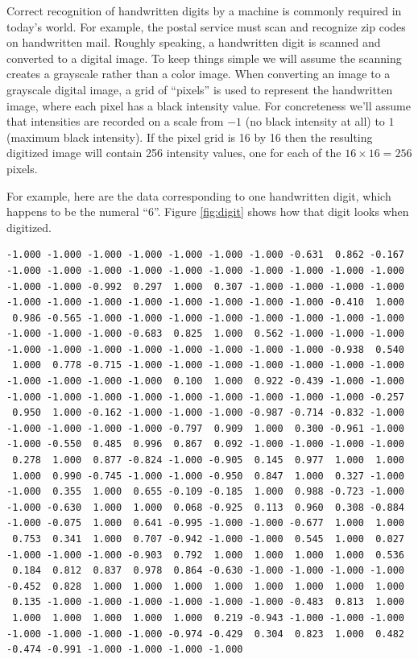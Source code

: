 \documentclass[]{krantz}
\begin{document}
Correct recognition of handwritten digits by a machine is commonly required in today's world. For example, the postal service must scan and recognize zip codes on handwritten mail. Roughly speaking, a handwritten digit is scanned and converted to a digital image. To keep things simple we will assume the scanning creates a grayscale rather than a color image. When converting an image to a grayscale digital image, a grid of ``pixels'' is used to represent the handwritten image, where each pixel has a black intensity value. For concreteness we'll assume that intensities are recorded on a scale from \(-1\) (no black intensity at all) to \(1\) (maximum black intensity). If the pixel grid is 16 by 16 then the resulting digitized image will contain 256 intensity values, one for each of the \(16\times 16 = 256\) pixels.

For example, here are the data corresponding to one handwritten digit, which happens to be the numeral ``6''. Figure \ref{fig:digit} shows how that digit looks when digitized.

\begin{verbatim}
-1.000 -1.000 -1.000 -1.000 -1.000 -1.000 -1.000 -0.631  0.862 -0.167 
-1.000 -1.000 -1.000 -1.000 -1.000 -1.000 -1.000 -1.000 -1.000 -1.000 
-1.000 -1.000 -0.992  0.297  1.000  0.307 -1.000 -1.000 -1.000 -1.000 
-1.000 -1.000 -1.000 -1.000 -1.000 -1.000 -1.000 -1.000 -0.410  1.000 
 0.986 -0.565 -1.000 -1.000 -1.000 -1.000 -1.000 -1.000 -1.000 -1.000 
-1.000 -1.000 -1.000 -0.683  0.825  1.000  0.562 -1.000 -1.000 -1.000 
-1.000 -1.000 -1.000 -1.000 -1.000 -1.000 -1.000 -1.000 -0.938  0.540 
 1.000  0.778 -0.715 -1.000 -1.000 -1.000 -1.000 -1.000 -1.000 -1.000 
-1.000 -1.000 -1.000 -1.000  0.100  1.000  0.922 -0.439 -1.000 -1.000 
-1.000 -1.000 -1.000 -1.000 -1.000 -1.000 -1.000 -1.000 -1.000 -0.257 
 0.950  1.000 -0.162 -1.000 -1.000 -1.000 -0.987 -0.714 -0.832 -1.000 
-1.000 -1.000 -1.000 -1.000 -0.797  0.909  1.000  0.300 -0.961 -1.000 
-1.000 -0.550  0.485  0.996  0.867  0.092 -1.000 -1.000 -1.000 -1.000 
 0.278  1.000  0.877 -0.824 -1.000 -0.905  0.145  0.977  1.000  1.000 
 1.000  0.990 -0.745 -1.000 -1.000 -0.950  0.847  1.000  0.327 -1.000 
-1.000  0.355  1.000  0.655 -0.109 -0.185  1.000  0.988 -0.723 -1.000 
-1.000 -0.630  1.000  1.000  0.068 -0.925  0.113  0.960  0.308 -0.884 
-1.000 -0.075  1.000  0.641 -0.995 -1.000 -1.000 -0.677  1.000  1.000 
 0.753  0.341  1.000  0.707 -0.942 -1.000 -1.000  0.545  1.000  0.027 
-1.000 -1.000 -1.000 -0.903  0.792  1.000  1.000  1.000  1.000  0.536 
 0.184  0.812  0.837  0.978  0.864 -0.630 -1.000 -1.000 -1.000 -1.000 
-0.452  0.828  1.000  1.000  1.000  1.000  1.000  1.000  1.000  1.000 
 0.135 -1.000 -1.000 -1.000 -1.000 -1.000 -1.000 -0.483  0.813  1.000 
 1.000  1.000  1.000  1.000  1.000  0.219 -0.943 -1.000 -1.000 -1.000 
-1.000 -1.000 -1.000 -1.000 -0.974 -0.429  0.304  0.823  1.000  0.482 
-0.474 -0.991 -1.000 -1.000 -1.000 -1.000 
\end{verbatim}
\end{document}
